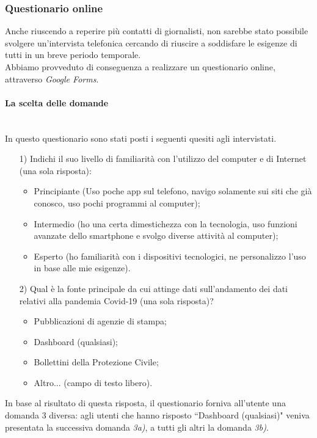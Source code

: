 \subsubsection{Questionario online}
Anche riuscendo a reperire più contatti di giornalisti, non sarebbe stato possibile svolgere un'intervista telefonica cercando di riuscire a soddisfare le esigenze di tutti in un breve periodo temporale.\\
Abbiamo provveduto di conseguenza a realizzare un questionario online, attraverso \textit{Google Forms}.

\paragraph{La scelta delle domande}\mbox{}\\
In questo questionario sono stati posti i seguenti quesiti agli intervistati.
\begin{itemize}
    \item[1)] Indichi il suo livello di familiarità con l'utilizzo del computer e di Internet (una sola risposta):
    \begin{itemize}
        \item Principiante (Uso poche app sul telefono, navigo solamente sui siti che già conosco, uso pochi programmi al computer);
        \item Intermedio (ho una certa dimestichezza con la tecnologia, uso funzioni avanzate dello smartphone e svolgo diverse attività al computer);
        \item Esperto (ho familiarità con i dispositivi tecnologici, ne personalizzo l'uso in base alle mie esigenze).
    \end{itemize}
    \item[2)] Qual è la fonte principale da cui attinge dati sull'andamento dei dati relativi alla pandemia Covid-19 (una sola risposta)?
    \begin{itemize}
        \item Pubblicazioni di agenzie di stampa;
        \item Dashboard (qualsiasi);
        \item Bollettini della Protezione Civile;
        \item Altro... (campo di testo libero).
    \end{itemize}
\end{itemize}
In base al risultato di questa risposta, il questionario forniva all'utente una domanda 3 diversa: agli utenti che hanno risposto ``Dashboard (qualsiasi)" veniva presentata la successiva domanda \textit{3a)}, a tutti gli altri la domanda \textit{3b)}.
